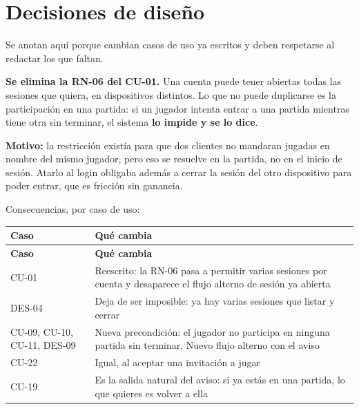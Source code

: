 \section*{Decisiones de diseño}

Se anotan aquí porque cambian casos de uso ya escritos y deben respetarse al redactar los que faltan.

\textbf{Se elimina la \mbox{RN-06} del \mbox{CU-01}.} Una cuenta puede tener abiertas todas las sesiones que quiera, en dispositivos distintos. Lo que no puede duplicarse es la participación en una partida: si un jugador intenta entrar a una partida mientras tiene otra sin terminar, el sistema \textbf{lo impide y se lo dice}.

\textbf{Motivo:} la restricción existía para que dos clientes no mandaran jugadas en nombre del mismo jugador, pero eso se resuelve en la partida, no en el inicio de sesión. Atarlo al login obligaba además a cerrar la sesión del otro dispositivo para poder entrar, que es fricción sin ganancia.

Consecuencias, por caso de uso:

\begin{center}\small
\begin{longtable}{|L{0.117\textwidth}|L{0.783\textwidth}|}
\hline
\textbf{Caso} & \textbf{Qué cambia} \\ \hline
\endfirsthead
\hline
\textbf{Caso} & \textbf{Qué cambia} \\ \hline
\endhead
\mbox{CU-01} & Reescrito: la \mbox{RN-06} pasa a permitir varias sesiones por cuenta y desaparece el flujo alterno de sesión ya abierta \\ \hline
\mbox{DES-04} & Deja de ser imposible: ya hay varias sesiones que listar y cerrar \\ \hline
\mbox{CU-09}, \mbox{CU-10}, \mbox{CU-11}, \mbox{DES-09} & Nueva precondición: el jugador no participa en ninguna partida sin terminar. Nuevo flujo alterno con el aviso \\ \hline
\mbox{CU-22} & Igual, al aceptar una invitación a jugar \\ \hline
\mbox{CU-19} & Es la salida natural del aviso: si ya estás en una partida, lo que quieres es volver a ella \\ \hline
\end{longtable}
\end{center}

